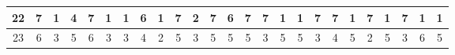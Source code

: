 \begin{sidewaystable}[]
\begin{tabular}{|c|c|c|c|c|c|c|c|c|c|c|c|c|c|c|c|c|c|c|c|c|c|c|c|c|}
    22      & 7                                               & 1                                               & 4                                               & 7                                               & 1                                               & 1                                               & 6                                               & 1                                               & 7                                               & 2                                                & 7                                                & 6                                                 &    7                                               & 7                                               & 1                                               & 1                                               & 7                                               & 7                                               & 1                                               & 7                                               & 1                                               & 7                                                & 1                                                & 1                                                \\ \hline
    23      & 6                                               & 3                                               & 5                                               & 6                                               & 3                                               & 3                                               & 4                                               & 2                                               & 5                                               & 3                                                & 5                                                & 5                                                 &    5                                               & 3                                               & 5                                               & 5                                               & 3                                               & 4                                               & 5                                               & 2                                               & 5                                               & 3                                                & 6                                                & 5                                                \\ \hline

\end{tabular}
\end{sidewaystable}
